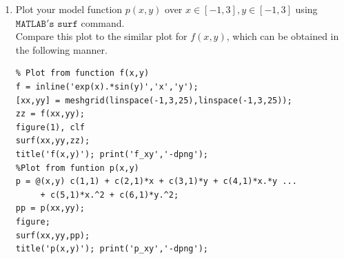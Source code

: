 \documentclass[14pt,a4paper]{article}
\begin{document}
\begin{enumerate}
		
		\item Plot your model function $p(x,y)$ over $x \in [-1, 3], y \in [-1,3]$ using $\mathtt{MATLAB's}$ $\mathtt{surf}$ command.\\
		Compare this plot to the similar plot for $f(x,y)$, which can be obtained in the following manner. 
		\begin{lstlisting}
% Plot from function f(x,y)
f = inline('exp(x).*sin(y)','x','y');
[xx,yy] = meshgrid(linspace(-1,3,25),linspace(-1,3,25));
zz = f(xx,yy);
figure(1), clf
surf(xx,yy,zz);
title('f(x,y)'); print('f_xy','-dpng');
%Plot from funtion p(x,y)
p = @(x,y) c(1,1) + c(2,1)*x + c(3,1)*y + c(4,1)*x.*y ...
     + c(5,1)*x.^2 + c(6,1)*y.^2;
pp = p(xx,yy);
figure;
surf(xx,yy,pp);
title('p(x,y)'); print('p_xy','-dpng');
		\end{lstlisting}
		

\end{enumerate}
\end{document}
